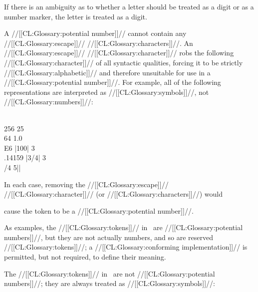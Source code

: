 If there is an ambiguity as to whether
a letter should be treated as a digit or as a number marker,
the letter is treated as a digit.





A //[[CL:Glossary:potential number]]// cannot contain any //[[CL:Glossary:escape]]//
//[[CL:Glossary:characters]]//.  An //[[CL:Glossary:escape]]// //[[CL:Glossary:character]]// robs the following
//[[CL:Glossary:character]]// of all syntactic qualities, forcing it to be strictly
//[[CL:Glossary:alphabetic]]// and therefore unsuitable for use in a
//[[CL:Glossary:potential number]]//.  For example, all of the following
representations are interpreted as //[[CL:Glossary:symbols]]//, not //[[CL:Glossary:numbers]]//:

\code
 \\256   25\\64   1.0\\E6   |100|   3\\.14159   |3/4|   3\\/4   5||
\endcode

In each case, removing the //[[CL:Glossary:escape]]// //[[CL:Glossary:character]]// (or //[[CL:Glossary:characters]]//) 
would 



cause the token to be a //[[CL:Glossary:potential number]]//.

\endsubsubsubsection%


As examples, the //[[CL:Glossary:tokens]]// in \thenextfigure\ are //[[CL:Glossary:potential numbers]]//,
but they are not actually numbers, and so are reserved //[[CL:Glossary:tokens]]//;
a //[[CL:Glossary:conforming implementation]]// is permitted, but not required,
to define their meaning.



The //[[CL:Glossary:tokens]]// in \thenextfigure\ are not //[[CL:Glossary:potential numbers]]//; 
they are always treated as //[[CL:Glossary:symbols]]//:


